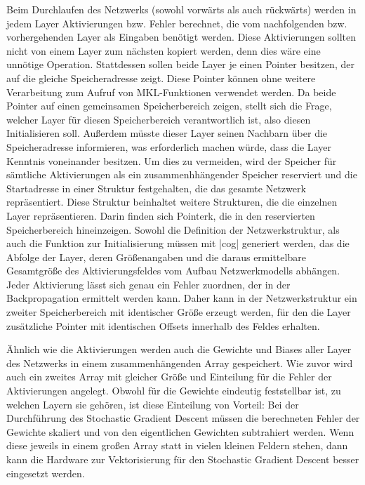 \documentclass[../main.tex]{subfiles}
\begin{document}
Beim Durchlaufen des Netzwerks (sowohl vorwärts als auch rückwärts) werden in jedem Layer Aktivierungen bzw. Fehler berechnet, die vom nachfolgenden bzw. vorhergehenden Layer als Eingaben benötigt werden. Diese Aktivierungen sollten nicht von einem Layer zum nächsten kopiert werden, denn dies wäre eine unnötige Operation. Stattdessen sollen beide Layer je einen Pointer besitzen, der auf die gleiche Speicheradresse zeigt. Diese Pointer können ohne weitere Verarbeitung zum Aufruf von MKL-Funktionen verwendet werden. Da beide Pointer auf einen gemeinsamen Speicherbereich zeigen, stellt sich die Frage, welcher Layer für diesen Speicherbereich verantwortlich ist, also diesen Initialisieren soll. Außerdem müsste dieser Layer seinen Nachbarn über die Speicheradresse informieren, was erforderlich machen würde, dass die Layer Kenntnis voneinander besitzen. Um dies zu vermeiden, wird der Speicher für sämtliche Aktivierungen als ein zusammenhhängender Speicher reserviert und die Startadresse in einer Struktur festgehalten, die das gesamte Netzwerk repräsentiert. Diese Struktur beinhaltet weitere Strukturen, die die einzelnen Layer repräsentieren. Darin finden sich Pointerk, die in den reservierten Speicherbereich hineinzeigen. Sowohl die Definition der Netzwerkstruktur, als auch die Funktion zur Initialisierung müssen mit |cog| generiert werden, das die Abfolge der Layer, deren Größenangaben und die daraus ermittelbare Gesamtgröße des Aktivierungsfeldes vom Aufbau Netzwerkmodells abhängen. Jeder Aktivierung lässt sich genau ein Fehler zuordnen, der in der Backpropagation ermittelt werden kann. Daher kann in der Netzwerkstruktur ein zweiter Speicherbereich mit identischer Größe erzeugt werden, für den die Layer zusätzliche Pointer mit identischen Offsets innerhalb des Feldes erhalten. 

Ähnlich wie die Aktivierungen werden auch die Gewichte und Biases aller Layer des Netzwerks in einem zusammenhängenden Array gespeichert. Wie zuvor wird auch ein zweites Array mit gleicher Größe und Einteilung für die Fehler der Aktivierungen angelegt. Obwohl für die Gewichte eindeutig feststellbar ist, zu welchen Layern sie gehören, ist diese Einteilung von Vorteil: Bei der Durchführung des Stochastic Gradient Descent müssen die berechneten Fehler der Gewichte skaliert und von den eigentlichen Gewichten subtrahiert werden. Wenn diese jeweils in einem großen Array statt in vielen kleinen Feldern stehen, dann kann die Hardware zur Vektorisierung für den Stochastic Gradient Descent besser eingesetzt werden. 
\end{document}
